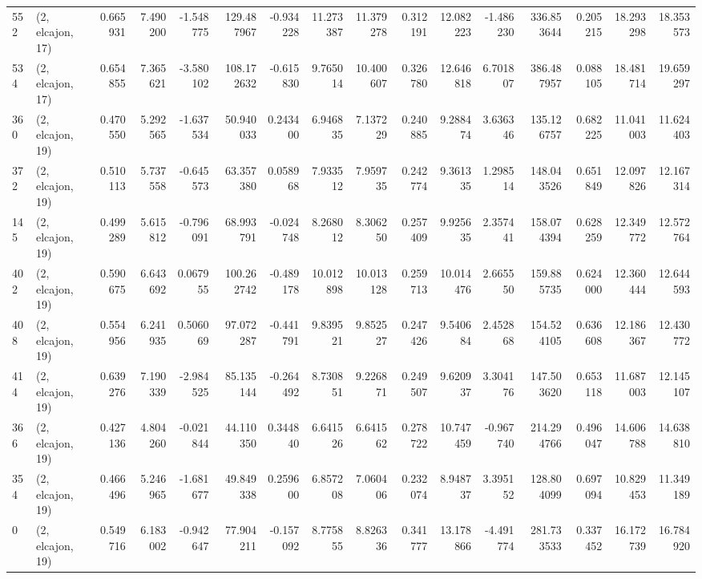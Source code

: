 \begin{tabular}{llrrrrrrrrrrrrrr}
552 &  (2, elcajon, 17) &   0.665931 &   7.490200 &  -1.548775 &   129.487967 &  -0.934228 &  11.273387 &  11.379278 &  0.312191 &  12.082223 &  -1.486230 &    336.853644 &   0.205215 &  18.293298 &   18.353573 \\
534 &  (2, elcajon, 17) &   0.654855 &   7.365621 &  -3.580102 &   108.172632 &  -0.615830 &   9.765014 &  10.400607 &  0.326780 &  12.646818 &   6.701807 &    386.487957 &   0.088105 &  18.481714 &   19.659297 \\
360 &  (2, elcajon, 19) &   0.470550 &   5.292565 &  -1.637534 &    50.940033 &   0.243400 &   6.946835 &   7.137229 &  0.240885 &   9.288474 &   3.636346 &    135.126757 &   0.682225 &  11.041003 &   11.624403 \\
372 &  (2, elcajon, 19) &   0.510113 &   5.737558 &  -0.645573 &    63.357380 &   0.058968 &   7.933512 &   7.959735 &  0.242774 &   9.361335 &   1.298514 &    148.043526 &   0.651849 &  12.097826 &   12.167314 \\
145 &  (2, elcajon, 19) &   0.499289 &   5.615812 &  -0.796091 &    68.993791 &  -0.024748 &   8.268012 &   8.306250 &  0.257409 &   9.925635 &   2.357441 &    158.074394 &   0.628259 &  12.349772 &   12.572764 \\
402 &  (2, elcajon, 19) &   0.590675 &   6.643692 &   0.067955 &   100.262742 &  -0.489178 &  10.012898 &  10.013128 &  0.259713 &  10.014476 &   2.665550 &    159.885735 &   0.624000 &  12.360444 &   12.644593 \\
408 &  (2, elcajon, 19) &   0.554956 &   6.241935 &   0.506069 &    97.072287 &  -0.441791 &   9.839521 &   9.852527 &  0.247426 &   9.540684 &   2.452868 &    154.524105 &   0.636608 &  12.186367 &   12.430772 \\
414 &  (2, elcajon, 19) &   0.639276 &   7.190339 &  -2.984525 &    85.135144 &  -0.264492 &   8.730851 &   9.226871 &  0.249507 &   9.620937 &   3.304176 &    147.503620 &   0.653118 &  11.687003 &   12.145107 \\
366 &  (2, elcajon, 19) &   0.427136 &   4.804260 &  -0.021844 &    44.110350 &   0.344840 &   6.641526 &   6.641562 &  0.278722 &  10.747459 &  -0.967740 &    214.294766 &   0.496047 &  14.606788 &   14.638810 \\
354 &  (2, elcajon, 19) &   0.466496 &   5.246965 &  -1.681677 &    49.849338 &   0.259600 &   6.857208 &   7.060406 &  0.232074 &   8.948737 &   3.395152 &    128.804099 &   0.697094 &  10.829453 &   11.349189 \\
0   &  (2, elcajon, 19) &   0.549716 &   6.183002 &  -0.942647 &    77.904211 &  -0.157092 &   8.775855 &   8.826336 &  0.341777 &  13.178866 &  -4.491774 &    281.733533 &   0.337452 &  16.172739 &   16.784920 \\

\end{tabular}
